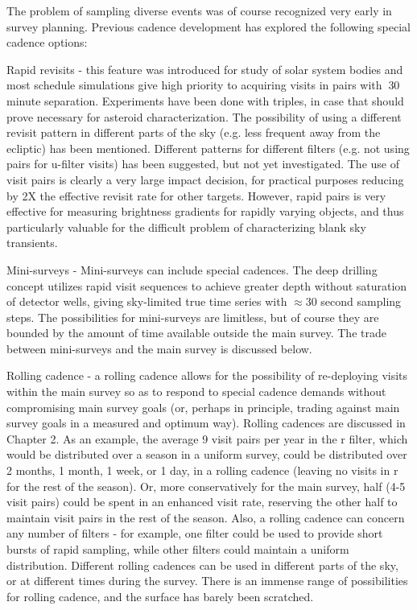 The problem of sampling diverse events was of course recognized very
early in survey planning. Previous cadence development has explored the
following special cadence options:

Rapid revisits - this feature was introduced for study of solar system
bodies and most schedule simulations give high priority to acquiring
visits in pairs with $~$30 minute separation.  Experiments have been
done with triples, in case that should prove necessary for asteroid
characterization.  The possibility of using a different revisit pattern
in different parts of the sky (e.g. less frequent away from the
ecliptic) has been mentioned.  Different patterns for different filters
(e.g. not using pairs for u-filter visits) has been suggested, but not
yet investigated.  The use of visit pairs is clearly a very large impact
decision, for practical purposes reducing by 2X the effective revisit
rate for other targets. However, rapid pairs is very effective for
measuring brightness gradients for rapidly varying objects, and thus
particularly valuable for the difficult problem of characterizing blank
sky transients.

Mini-surveys -  Mini-surveys can include special cadences. The deep
drilling concept utilizes rapid visit sequences to achieve greater depth
without saturation of detector wells, giving sky-limited true time
series with $\approx$30 second sampling steps.  The possibilities for
mini-surveys are limitless, but of course they are bounded by the amount
of time available outside the main survey. The trade between
mini-surveys and the main survey is discussed below.

Rolling cadence - a rolling cadence allows for the possibility of
re-deploying visits within the main survey so as to respond to special
cadence demands without compromising main survey goals (or, perhaps in
principle, trading against main survey goals in a measured and optimum
way). Rolling cadences are discussed in Chapter 2.  As an example, the
average 9 visit pairs per year in the r filter, which would be
distributed over a season in a uniform survey, could be distributed over
2 months, 1 month, 1 week, or 1 day, in a rolling cadence (leaving no
visits in r for the rest of the season).  Or, more conservatively for
the main survey, half (4-5 visit pairs) could be spent in an enhanced
visit rate, reserving the other half to maintain visit pairs in the rest
of the season.  Also, a rolling cadence can concern any number of
filters - for example, one filter could be used to provide short bursts
of rapid sampling, while other filters could maintain a uniform
distribution.  Different rolling cadences can be used in different parts
of the sky, or at different times during the survey.  There is an
immense range of possibilities for rolling cadence, and the surface has
barely been scratched.

